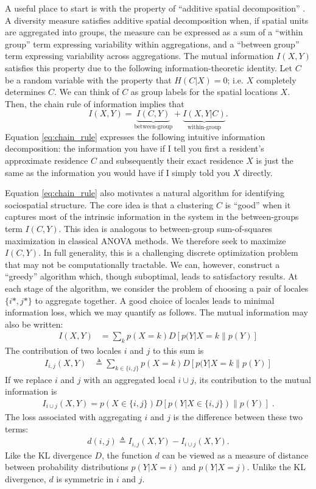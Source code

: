 \documentclass[english]{scrartcl}
\begin{document}
	A useful place to start is with the property of ``additive spatial decomposition'' \cite{Reardon2004}. A diversity measure satisfies additive spatial decomposition when, if spatial units are aggregated into groups, the measure can be expressed as a sum of a ``within group'' term expressing variability within aggregations, and a ``between group'' term expressing variability across aggregations. The mutual information $I(X,Y)$ satisfies this property due to the following information-theoretic identity. Let $C$ be a random variable with the property that $H(C|X) = 0$; i.e. $X$ completely determines $C$. We can think of $C$ as group labels for the spatial locations $X$. Then, the chain rule of information implies that 
	\begin{equation}
		I(X,Y) = \underbrace{I(C,Y)}_{\text{between-group}} + \underbrace{I(X,Y|C)}_{\text{within-group}}. \label{eq:chain_rule}
	\end{equation}
	Equation \eqref{eq:chain_rule} expresses the following intuitive information decomposition: the information you have if I tell you first a resident's approximate residence $C$ and subsequently their exact residence $X$ is just the same as the information you would have if I simply told you $X$ directly. 

	Equation \eqref{eq:chain_rule} also motivates a natural algorithm for identifying sociospatial structure. The core idea is that a clustering $C$ is ``good'' when it captures most of the intrinsic information in the system in the between-groups term $I(C,Y)$. This idea is analogous to between-group sum-of-squares maximization in classical ANOVA methods. We therefore seek to maximize $I(C,Y)$. In full generality, this is a challenging discrete optimization problem that may not be computationally tractable. We can, however, construct a ``greedy'' algorithm which, though suboptimal, leads to satisfactory results. At each stage of the algorithm, we consider the problem of choosing a pair of locales $\{i*, j*\}$ to aggregate together. A good choice of locales leads to minimal information loss, which we may quantify as follows. The mutual information may also be written: 
	\begin{align}
	 	I(X,Y) &= \sum_k p(X = k) D[p(Y|X = k\|p(Y)] 
	\end{align} 
	The contribution of two locales $i$ and $j$ to this sum is 
	\begin{align}
		I_{i,j}(X,Y) &\triangleq \sum_{k \in \{i,j\}} p(X = k)D[p(Y|X = k\|p(Y)] 
	\end{align}
	If we replace $i$ and $j$ with an aggregated local $i\cup j$, its contribution to the mutual information is 
	\begin{align}
		I_{i\cup j}(X,Y) = p(X \in \{i,j\}) D[p(Y|X \in \{i,j\}) \| p(Y)]\;.
	\end{align}
	The  loss associated with aggregating $i$ and $j$ is the difference between these two terms: 
	\begin{align}
		d(i,j) \triangleq I_{i,j}(X,Y) - I_{i \cup j}(X,Y).  
	\end{align}
	Like the KL divergence $D$, the function $d$ can be viewed as a measure of distance between probability distributions $p(Y|X = i)$ and $p(Y|X = j)$. Unlike the KL divergence, $d$ is symmetric in $i$ and $j$. 
\end{document}
